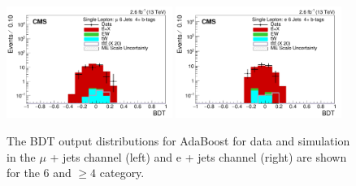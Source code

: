 \begin{figure}[ht!]
    \includegraphics[width=0.48\textwidth]{images/Run2/BDT_Mu29Aug400trees_5MinNodeSize_20nCuts_3MaxDepth_5adaboostbeta_adaBoost_alphaSTune_noMinEvents6nJets4nMtags_StackLogY.pdf}
    \includegraphics[width=0.48\textwidth]{images/Run2/BDT_El29Aug400trees_5MinNodeSize_20nCuts_3MaxDepth_5adaboostbeta_adaBoost_alphaSTune_noMinEvents6nJets4nMtags_StackLogY.pdf}
    \caption{The BDT output distributions for AdaBoost for data and simulation in the $\mu$ + jets channel (left) and e + jets channel (right) are shown for the 6 \njets and $\geq4$ \nMtags category.}
    \label{fig:BDT_Mu29Aug400trees_5MinNodeSize_20nCuts_3MaxDepth_5adaboostbeta_adaBoost_alphaSTune_noMinEvents64}
\end{figure}

